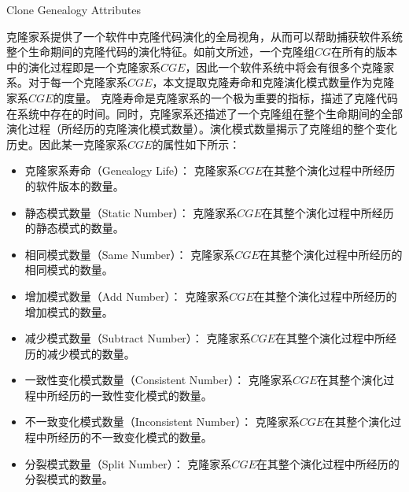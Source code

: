 {Clone Genealogy Attributes}

克隆家系提供了一个软件中克隆代码演化的全局视角，从而可以帮助捕获软件系统整个生命期间的克隆代码的演化特征。如前文所述，一个克隆组{$CG$}在所有的版本中的演化过程即是一个克隆家系{$CGE$}，因此一个软件系统中将会有很多个克隆家系。对于每一个克隆家系{$CGE$}，本文提取{克隆寿命}和{克隆演化模式数量}作为克隆家系{$CGE$}的度量。{ 克隆寿命}是克隆家系的一个极为重要的指标，描述了克隆代码在系统中存在的时间。同时，克隆家系还描述了一个克隆组在整个生命期间的全部演化过程（所经历的克隆演化模式数量）。演化模式数量揭示了克隆组的整个变化历史。因此某一克隆家系{$CGE$}的属性如下所示：

\begin{itemize}
\item
克隆家系寿命（Genealogy  Life）：
克隆家系{$CGE$}在其整个演化过程中所经历的软件版本的数量。
\item
静态模式数量（Static Number）：
克隆家系{$CGE$}在其整个演化过程中所经历的静态模式的数量。
\item
相同模式数量（Same Number）：
克隆家系{$CGE$}在其整个演化过程中所经历的相同模式的数量。
\item
增加模式数量（Add Number）：
克隆家系{$CGE$}在其整个演化过程中所经历的增加模式的数量。
\item
减少模式数量（Subtract Number）：
克隆家系{$CGE$}在其整个演化过程中所经历的减少模式的数量。
\item
一致性变化模式数量（Consistent Number）：
克隆家系{$CGE$}在其整个演化过程中所经历的一致性变化模式的数量。
\item
不一致变化模式数量（Inconsistent Number）：
克隆家系{$CGE$}在其整个演化过程中所经历的不一致变化模式的数量。
\item
分裂模式数量（Split Number）：
克隆家系{$CGE$}在其整个演化过程中所经历的分裂模式的数量。
\end{itemize}

